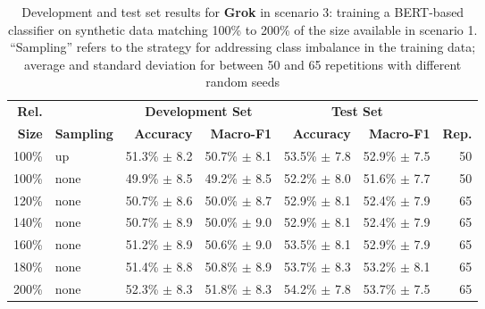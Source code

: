
\begin{table*}[ht]
\centering
\begin{tabular}{rlrrrrr}
\textbf{Rel.}  &  &
\multicolumn{2}{c}{\textbf{Development Set}} &
\multicolumn{2}{c}{\textbf{Test Set}} \\
\textbf{Size}  & \textbf{Sampling}  &
\textbf{Accuracy} & \textbf{Macro-F1}  &
\textbf{Accuracy} & \textbf{Macro-F1}  &
\textbf{Rep.}  \\
\hline
100\%  & up  &   51.3\% $\pm$    8.2  &   50.7\% $\pm$    8.1  &   53.5\% $\pm$    7.8  &   52.9\% $\pm$    7.5  & 50  \\
\hline
100\%  & none  &   49.9\% $\pm$    8.5  &   49.2\% $\pm$    8.5  &   52.2\% $\pm$    8.0  &   51.6\% $\pm$    7.7  & 50  \\
120\%  & none  &   50.7\% $\pm$    8.6  &   50.0\% $\pm$    8.7  &   52.9\% $\pm$    8.1  &   52.4\% $\pm$    7.9  & 65  \\
140\%  & none  &   50.7\% $\pm$    8.9  &   50.0\% $\pm$    9.0  &   52.9\% $\pm$    8.1  &   52.4\% $\pm$    7.9  & 65  \\
160\%  & none  &   51.2\% $\pm$    8.9  &   50.6\% $\pm$    9.0  &   53.5\% $\pm$    8.1  &   52.9\% $\pm$    7.9  & 65  \\
180\%  & none  &   51.4\% $\pm$    8.8  &   50.8\% $\pm$    8.9  &   53.7\% $\pm$    8.3  &   53.2\% $\pm$    8.1  & 65  \\
200\%  & none  &   52.3\% $\pm$    8.3  &   51.8\% $\pm$    8.3  &   54.2\% $\pm$    7.8  &   53.7\% $\pm$    7.5  & 65  \\
\hline
\end{tabular}
\caption{Development and test set results for \textbf{Grok} in scenario 3:
    training a BERT-based classifier on synthetic data matching
    100\% to 200\% of the size available in scenario 1.
    ``Sampling'' refers to the strategy for addressing class
    imbalance in the training data; average and standard deviation for between 50 and 65 repetitions with different random seeds}
\label{t:results-s4-gr4k}
\end{table*}
